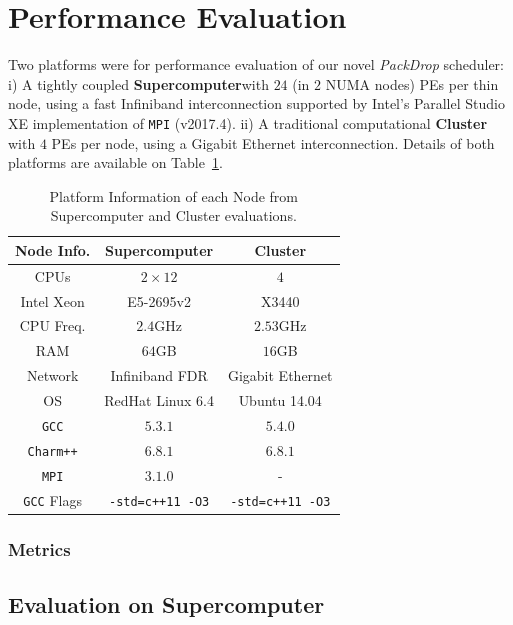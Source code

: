 \section{Performance Evaluation}

Two platforms were for performance evaluation of our novel \textit{PackDrop} scheduler:
i) A tightly coupled \textbf{Supercomputer}with $24$ (in $2$ NUMA nodes) PEs per thin node, using a fast Infiniband interconnection supported by Intel's Parallel Studio XE implementation of \texttt{MPI} (v2017.4).
ii) A traditional computational \textbf{Cluster} with $4$ PEs per node, using a Gigabit Ethernet interconnection.
Details of both platforms are available on Table~\ref{tab:ptinfo}.

\begin{table}[ht]
    \centering
	\begin{tabular}{c|c|c}
	Node Info.	 		& Supercomputer 		& Cluster \\ \hline
        CPUs	   			& $2\times12$ 			& $4$ \\
        Intel Xeon			& E5-2695v2 			& X3440\\
        CPU Freq.  			& $2.4$GHz   			& $2.53$GHz\\
        RAM        			& $64$GB			& $16$GB\\
        Network 			& Infiniband FDR 		& Gigabit Ethernet\\
        OS      			& RedHat Linux 6.4 		& Ubuntu 14.04\\
        \texttt{GCC}			& $5.3.1$			& $5.4.0$\\
        \texttt{Charm++} 		& $6.8.1$ 			& $6.8.1$\\
        \texttt{MPI}			& $3.1.0$			& -\\
        \texttt{GCC} Flags		& \texttt{-std=c++11 -O3} 	& \texttt{-std=c++11 -O3} \\
	\end{tabular}
    \caption{Platform Information of each Node from Supercomputer and Cluster evaluations. }
    \label{tab:ptinfo}
\end{table}



\subsubsection*{Metrics}

\subsection{Evaluation on Supercomputer}


